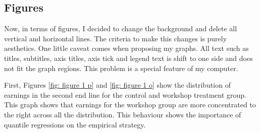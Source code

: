 \documentclass{article}
\begin{document}
\newpage

\subsection{Figures}

Now, in terms of figures, I decided to change the background and delete all vertical and horizontal lines. The criteria to make this changes is purely aesthetics. One little caveat comes when proposing my graphs. All text such as titles, subtitles, axis titles, axis tick and legend text is shift to one side and does not fit the graph regions. This problem is a special feature of my computer. 

\begin{figure}[h!]
\censubtering
  \qquad
\end{figure}

\noindent First, Figures \ref{fig: figure 1 p} and \ref{fig: figure 1 o} show the distribution of earnings in the second end line for the control and workshop treatment group. This graph shows that earnings for the workshop group are more concentrated to the right across all the distribution. This behaviour shows the importance of quantile regressions on the empirical strategy.  
\end{document}
